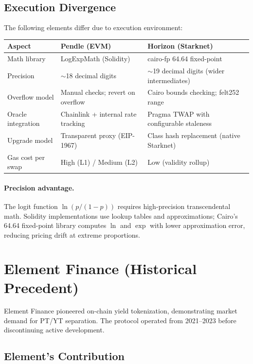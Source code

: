 \subsection{Execution Divergence}

The following elements differ due to execution environment:

\begin{center}
\begin{tabularx}{\textwidth}{l l >{\raggedright\arraybackslash}X}
\toprule
\textbf{Aspect} & \textbf{Pendle (EVM)} & \textbf{Horizon (Starknet)} \\
\midrule
Math library & LogExpMath (Solidity) & cairo-fp 64.64 fixed-point \\
Precision & $\sim$18 decimal digits & $\sim$19 decimal digits (wider intermediates) \\
Overflow model & Manual checks; revert on overflow & Cairo bounds checking; felt252 range \\
Oracle integration & Chainlink + internal rate tracking & Pragma TWAP with configurable staleness \\
Upgrade model & Transparent proxy (EIP-1967) & Class hash replacement (native Starknet) \\
Gas cost per swap & High (L1) / Medium (L2) & Low (validity rollup) \\
\bottomrule
\end{tabularx}
\end{center}

\paragraph{Precision advantage.}
The logit function $\ln(p/(1-p))$ requires high-precision transcendental math. Solidity implementations use lookup tables and approximations; Cairo's 64.64 fixed-point library computes $\ln$ and $\exp$ with lower approximation error, reducing pricing drift at extreme proportions.


\section{Element Finance (Historical Precedent)}

Element Finance pioneered on-chain yield tokenization, demonstrating market demand for PT/YT separation. The protocol operated from 2021--2023 before discontinuing active development.

\subsection{Element's Contribution}

